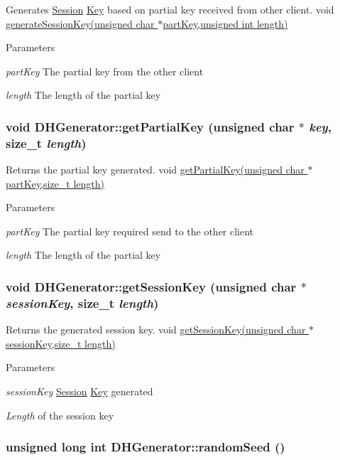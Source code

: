 Generates \hyperlink{classSession}{Session} \hyperlink{structKey}{Key} based on partial key received from other client. void \hyperlink{classDHGenerator_a9e52156b2bfe8a0aa95f111c07e50017}{generateSessionKey(unsigned char $\ast$partKey,unsigned int length)} 
\begin{DoxyParams}{Parameters}
\item[{\em partKey}]The partial key from the other client \item[{\em length}]The length of the partial key \end{DoxyParams}
\hypertarget{classDHGenerator_a77e90d6b4e09770058ca1a6ad114b154}{
\subsubsection[{getPartialKey}]{\setlength{\rightskip}{0pt plus 5cm}void DHGenerator::getPartialKey (unsigned char $\ast$ {\em key}, \/  size\_\-t {\em length})}}
\label{classDHGenerator_a77e90d6b4e09770058ca1a6ad114b154}


Returns the partial key generated. void \hyperlink{classDHGenerator_a77e90d6b4e09770058ca1a6ad114b154}{getPartialKey(unsigned char $\ast$partKey,size\_\-t length)} 
\begin{DoxyParams}{Parameters}
\item[{\em partKey}]The partial key required send to the other client \item[{\em length}]The length of the partial key \end{DoxyParams}
\hypertarget{classDHGenerator_af3d29e0133f4edb47de9350dd99d0c25}{
\subsubsection[{getSessionKey}]{\setlength{\rightskip}{0pt plus 5cm}void DHGenerator::getSessionKey (unsigned char $\ast$ {\em sessionKey}, \/  size\_\-t {\em length})}}
\label{classDHGenerator_af3d29e0133f4edb47de9350dd99d0c25}


Returns the generated session key. void \hyperlink{classDHGenerator_af3d29e0133f4edb47de9350dd99d0c25}{getSessionKey(unsigned char $\ast$sessionKey,size\_\-t length)} 
\begin{DoxyParams}{Parameters}
\item[{\em sessionKey}]\hyperlink{classSession}{Session} \hyperlink{structKey}{Key} generated \item[{\em Length}]of the session key \end{DoxyParams}
\hypertarget{classDHGenerator_a0251a2c6e322e718c133732c8cd01821}{
\subsubsection[{randomSeed}]{\setlength{\rightskip}{0pt plus 5cm}unsigned long int DHGenerator::randomSeed ()}}
\label{classDHGenerator_a0251a2c6e322e718c133732c8cd01821}


